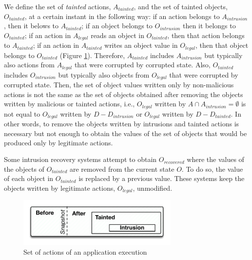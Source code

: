We define the set of \textit{tainted} actions, $A_{tainted}$, and the set of tainted objects, $O_{tainted}$, at a certain instant in the following way: if an action belongs to $A_{intrusion}$, then it belows to $A_{tainted}$; if an object belongs to $O_{intrusion}$ then it belongs to $O_{tainted}$; if an action in $A_{legal}$ reads an object in $O_{tainted}$, then that action belongs to $A_{tainted}$; if an action in $A_{tainted}$ writes an object value in $O_{legal}$, then that object belongs to $O_{tainted}$ (Figure \ref{img:sets}). Therefore, $A_{tainted}$ includes $A_{intrusion}$ but typically also actions from $A_{legal}$ that were corrupted by corrupted state. Also, $O_{tainted}$ includes $O_{intrusion}$ but typically also objects from $O_{legal}$ that were corrupted by corrupted state. Then, the set of object values written only by non-malicious actions is not the same as the set of objects obtained after removing the objects written by malicious or tainted actions, i.e., $O_{legal}$ written by $A \cap A_{intrusion} = \emptyset$ is not equal to $O_{legal}$ written by $D-D_{intrusion}$ or $O_{legal}$ written by $D-D_{tainted}$. In other words, to remove the objects written by intrusions and tainted actions is necessary but not enough to obtain the values of the set of objects that would be produced only by legitimate actions.

Some intrusion recovery systems \cite{taser,itdb,phoenix} attempt to obtain $O_{recovered}$ where the values of the objects of $O_{tainted}$ are removed from the current state $O$. To do so, the value of each object in $O_{tainted}$ is replaced by a previous value. These systems keep the objects written by legitimate actions, $O_{legal}$, unmodified. \\


\begin{figure}
  \centering
  \includegraphics[width=80mm]{images/sets}
  \caption{Set of actions of an application execution}
  \label{img:sets}
\end{figure}


